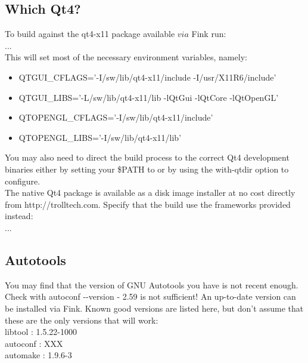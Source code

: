\subsection{Which Qt4?}

To build against the qt4-x11 package available $via$ Fink run:\\

 ...\\

This will set most of the necessary environment variables, namely:\\
{\sffamily
\begin{itemize}
	\item QTGUI\_CFLAGS='-I/sw/lib/qt4-x11/include -I/usr/X11R6/include'
	\item QTGUI\_LIBS='-L/sw/lib/qt4-x11/lib -lQtGui -lQtCore -lQtOpenGL'
	\item QTOPENGL\_CFLAGS='-I/sw/lib/qt4-x11/include'
	\item QTOPENGL\_LIBS='-I/sw/lib/qt4-x11/lib'
\end{itemize}
}

You may also need to direct the build process to the correct Qt4 development binaries either by setting your \$PATH to  or by using the {\sffamily {-}{-}with-qtdir} option to {\sffamily configure}.\\

The native Qt4 package is available as a disk image installer at no cost directly from http://trolltech.com. Specify that the build use the frameworks provided instead:\\

 ...\\

\subsection{Autotools}
You may find that the version of GNU Autotools you have is not recent enough. Check with {\sffamily autoconf {-}{-}version} - 2.59 is not sufficient! An up-to-date version can be installed via Fink. Known good versions are listed here, but don't assume that these are the only versions that will work:\\

{\sffamily
\indent libtool  :  1.5.22-1000\\
\indent autoconf :  XXX\\
\indent automake :  1.9.6-3\\
}

